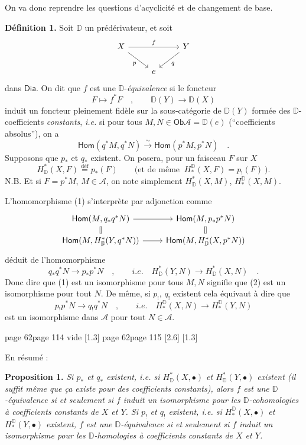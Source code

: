 \documentclass[11pt,leqno]{article}
\newcommand{\printedpage}[1]{\marginnote{\scriptsize\sffamily ed.\ #1}}
\newcommand{\msp}[1]{%
  \begingroup\def\thismsp{#1}\def\blankmsp{page 114 vide}%
  \ifx\thismsp\blankmsp
    \marginnote{\scriptsize\sffamily [114: vide]}[1.3\baselineskip]%
  \else\def\followingmsp{page 115}%
    \ifx\thismsp\followingmsp
      \marginnote{\scriptsize\sffamily [page 115]}[2.6\baselineskip]%
    \else\marginnote{\scriptsize\sffamily [#1]}[1.3\baselineskip]\fi
  \fi\endgroup}
\newcommand{\DD}{\ensuremath{\mathbb{D}}}
\newcommand{\cA}{\ensuremath{\mathcal{A}}}
\newcommand{\Dia}{\ensuremath{\mathsf{Dia}}}
\newcommand{\Ob}{\ensuremath{\mathsf{Ob}}}
\newcommand{\Hom}{\ensuremath{\mathsf{Hom}}}
\newcommand{\isolongto}{\overset{\sim}{\longrightarrow}}
\begin{document}
On va donc reprendre les questions d'acyclicité et de changement de base.

\noindent\textbf{Définition 1.} Soit $\DD$ un prédérivateur, et soit
\[
\begin{tikzcd}
X \arrow[rr, "f"] \arrow[dr, "p"'] & & Y \arrow[dl, "q"] \\
& e &
\end{tikzcd}
\]
dans $\Dia$. On dit que $f$ est une $\DD$-\textit{équivalence} si le foncteur
\[
F \longmapsto f^*F \quad , \qquad \DD(Y) \longrightarrow \DD(X)
\]
induit un foncteur pleinement fidèle sur la sous-catégorie de $\DD(Y)$ formée des $\DD$-coefficients \textit{constants}, \textit{i.e.} si pour tous $M, N \in \Ob \cA = \DD(e)$ (“coefficients absolus”), on a
\[
\Hom(q^*M, q^*N) \isolongto \Hom(p^*M, p^*N) \quad . \tag*{(1)}
\]
Supposons que $p_*$ et $q_*$ existent. On posera, pour un faisceau $F$ sur $X$
\[
H^*_{\DD}(X, F) \overset{\text{déf}}{=} p_*(F) \qquad \text{(et de même } \ H^{\DD}_*(X, F) = p_!(F) \ \text{).}
\]
N.B. Et si $F = p^*M$, $M \in \cA$, on note simplement $H^*_{\DD}(X, M)$, $H^{\DD}_*(X, M)$.

\noindent L'homomorphisme (1) s'interprète par adjonction comme
\[
\begin{tikzcd}[row sep=small]
\Hom(M, q_*q^*N) \arrow[r] \arrow[d, equal] & \Hom(M, p_*p^*N) \arrow[d, equal] \\
\Hom(M, H^*_{\DD}(Y, q^*N)) \arrow[r] & \Hom(M, H^*_{\DD}(X, p^*N))
\end{tikzcd}
\]
déduit de l'homomorphisme
\[
q_*q^*N \longrightarrow p_*p^*N \quad , \qquad \textit{i.e.} \quad H^*_{\DD}(Y, N) \longrightarrow H^*_{\DD}(X, N) \quad . \tag*{(2)}
\]
Donc dire que (1) est un isomorphisme pour tous $M, N$ signifie que (2) est un isomorphisme pour tout $N$. De même, si $p_!$, $q_!$ existent cela équivaut à dire que
\[
p_!p^*N \longrightarrow q_!q^*N \quad , \qquad \textit{i.e.} \quad H^{\DD}_*(X, N) \longrightarrow H^{\DD}_*(Y, N) \tag*{$(2')$}
\]
est un isomorphisme dans $\cA$ pour tout $N \in \cA$.

\clearpage
\printedpage{36}
\noindent\msp{page 62}

\noindent En résumé :

\noindent\textbf{Proposition 1.} \textit{Si $p_*$ et $q_*$ existent, i.e. si $H^*_{\DD}(X, \bullet)$ et $H^*_{\DD}(Y, \bullet)$ existent (il suffit même que ça existe pour des coefficients constants), alors $f$ est une $\DD$-équivalence si et seulement si $f$ induit un isomorphisme pour les $\DD$-cohomologies à coefficients constants de $X$ et $Y$. Si $p_!$ et $q_!$ existent, i.e. si $H^{\DD}_*(X, \bullet)$ et $H^{\DD}_*(Y, \bullet)$ existent, $f$ est une $\DD$-équivalence si et seulement si $f$ induit un isomorphisme pour les $\DD$-homologies à coefficients constants de $X$ et $Y$.}
\end{document}
